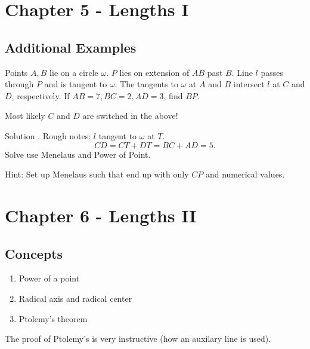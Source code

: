 \documentclass[11pt,twoside]{scrartcl}
\begin{document}
\section{Chapter 5 - Lengths I}
\subsection{Additional Examples}
\begin{example}
    Points $A, B$ lie on a circle $\omega$. $P$ lies on extension of $AB$ past $B$. Line $l$ passes through $P$ and is tangent to $\omega$. The tangents to $\omega$ at $A$ and $B$ intersect $l$ at $C$ and $D$, respectively. If $AB=7, BC=2, AD=3$, find $BP$.
\end{example}
\begin{note}
    Most likely $C$ and $D$ are switched in the above!
\end{note}
Solution \TBD. Rough notes:
$l$ tangent to $\omega$ at $T$. 
\[CD = CT + DT = BC + AD = 5.\]
Solve use Menelaus and Power of Point. 

Hint: Set up Menelaus such that end up with only $CP$ and numerical values.

\clearpage
\section{Chapter 6 - Lengths II}
\subsection{Concepts}
\begin{enumerate}
    \item Power of a point
    \item Radical axis and radical center
    \item Ptolemy's theorem
\end{enumerate}

\begin{remark}
    The proof of Ptolemy's is very instructive (how an auxilary line is used).
\end{remark}
\end{document}
